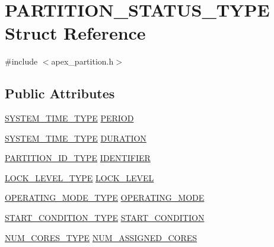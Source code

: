 \hypertarget{structPARTITION__STATUS__TYPE}{}\section{P\+A\+R\+T\+I\+T\+I\+O\+N\+\_\+\+S\+T\+A\+T\+U\+S\+\_\+\+T\+Y\+PE Struct Reference}
\label{structPARTITION__STATUS__TYPE}


{\ttfamily \#include $<$apex\+\_\+partition.\+h$>$}

\subsection*{Public Attributes}
\begin{DoxyCompactItemize}
\item 
\hyperlink{apex__types_8h_a78cd52c2621ddf2eda68fcd4bedbc1a7}{S\+Y\+S\+T\+E\+M\+\_\+\+T\+I\+M\+E\+\_\+\+T\+Y\+PE} \hyperlink{structPARTITION__STATUS__TYPE_af7b3d2efeee84266bb2272989468a77b}{P\+E\+R\+I\+OD}
\item 
\hyperlink{apex__types_8h_a78cd52c2621ddf2eda68fcd4bedbc1a7}{S\+Y\+S\+T\+E\+M\+\_\+\+T\+I\+M\+E\+\_\+\+T\+Y\+PE} \hyperlink{structPARTITION__STATUS__TYPE_add054a9d2ba7b24f4d891aefb7ad129b}{D\+U\+R\+A\+T\+I\+ON}
\item 
\hyperlink{apex__partition_8h_a98710ee510022d5d100c8f2d320efad7}{P\+A\+R\+T\+I\+T\+I\+O\+N\+\_\+\+I\+D\+\_\+\+T\+Y\+PE} \hyperlink{structPARTITION__STATUS__TYPE_a7a769c63fafb1db12e997539dbbf92ae}{I\+D\+E\+N\+T\+I\+F\+I\+ER}
\item 
\hyperlink{apex__process_8h_a45e0a7a5bf30c61fe6a5fe1ed96f27d2}{L\+O\+C\+K\+\_\+\+L\+E\+V\+E\+L\+\_\+\+T\+Y\+PE} \hyperlink{structPARTITION__STATUS__TYPE_a7897783426caa52ad5015696c41111c7}{L\+O\+C\+K\+\_\+\+L\+E\+V\+EL}
\item 
\hyperlink{apex__partition_8h_a79d9616db80ce78328edcd1987aa90b1}{O\+P\+E\+R\+A\+T\+I\+N\+G\+\_\+\+M\+O\+D\+E\+\_\+\+T\+Y\+PE} \hyperlink{structPARTITION__STATUS__TYPE_a11ddb9ecc1f3a00638bb282d442f4960}{O\+P\+E\+R\+A\+T\+I\+N\+G\+\_\+\+M\+O\+DE}
\item 
\hyperlink{apex__partition_8h_afefc0c2dc013745df97678ba67354324}{S\+T\+A\+R\+T\+\_\+\+C\+O\+N\+D\+I\+T\+I\+O\+N\+\_\+\+T\+Y\+PE} \hyperlink{structPARTITION__STATUS__TYPE_ac235ddfbaadeeffbe6a65f0f2fea69a6}{S\+T\+A\+R\+T\+\_\+\+C\+O\+N\+D\+I\+T\+I\+ON}
\item 
\hyperlink{apex__partition_8h_a010e5f5601385be74052b2c419491e28}{N\+U\+M\+\_\+\+C\+O\+R\+E\+S\+\_\+\+T\+Y\+PE} \hyperlink{structPARTITION__STATUS__TYPE_a811192806118ead344b259aa17b4e91f}{N\+U\+M\+\_\+\+A\+S\+S\+I\+G\+N\+E\+D\+\_\+\+C\+O\+R\+ES}
\end{DoxyCompactItemize}


